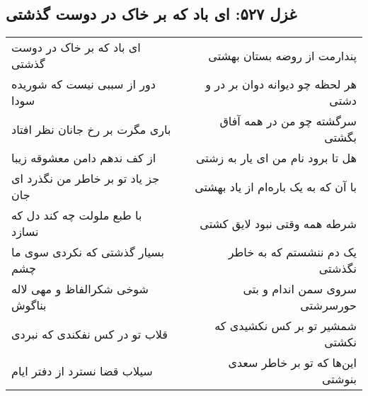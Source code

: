 \begin{center}
\section*{غزل ۵۲۷: ای باد که بر خاک در دوست گذشتی}
\label{sec:527}
\begin{longtable}{l p{0.5cm} r}
ای باد که بر خاک در دوست گذشتی
&&
پندارمت از روضه بستان بهشتی
\\
دور از سببی نیست که شوریده سودا
&&
هر لحظه چو دیوانه دوان بر در و دشتی
\\
باری مگرت بر رخ جانان نظر افتاد
&&
سرگشته چو من در همه آفاق بگشتی
\\
از کف ندهم دامن معشوقه زیبا
&&
هل تا برود نام من ای یار به زشتی
\\
جز یاد تو بر خاطر من نگذرد ای جان
&&
با آن که به یک باره‌ام از یاد بهشتی
\\
با طبع ملولت چه کند دل که نسازد
&&
شرطه همه وقتی نبود لایق کشتی
\\
بسیار گذشتی که نکردی سوی ما چشم
&&
یک دم ننشستم که به خاطر نگذشتی
\\
شوخی شکرالفاظ و مهی لاله بناگوش
&&
سروی سمن اندام و بتی حورسرشتی
\\
قلاب تو در کس نفکندی که نبردی
&&
شمشیر تو بر کس نکشیدی که نکشتی
\\
سیلاب قضا نسترد از دفتر ایام
&&
این‌ها که تو بر خاطر سعدی بنوشتی
\\
\end{longtable}
\end{center}
